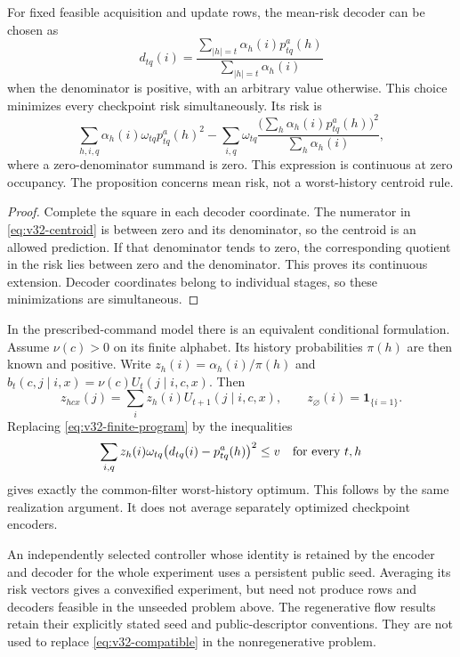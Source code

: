 \begin{proposition}\label{prop:v32-centroids}
For fixed feasible acquisition and update rows, the mean-risk decoder can
be chosen as
\begin{equation}\label{eq:v32-centroid}
 d_{tq}(i)=
 \frac{\sum_{|h|=t}\alpha_h(i)p^a_{tq}(h)}
      {\sum_{|h|=t}\alpha_h(i)}
\end{equation}
when the denominator is positive, with an arbitrary value otherwise.
This choice minimizes every checkpoint risk simultaneously. Its risk is
\[
 \sum_{h,i,q}\alpha_h(i)\omega_{tq}p^a_{tq}(h)^2
 -\sum_{i,q}\omega_{tq}
  \frac{\bigl(\sum_h\alpha_h(i)p^a_{tq}(h)\bigr)^2}
       {\sum_h\alpha_h(i)},
\]
where a zero-denominator summand is zero. This expression is continuous
at zero occupancy. The proposition concerns mean risk, not a
worst-history centroid rule.
\end{proposition}
\begin{proof}
Complete the square in each decoder coordinate. The numerator in
\eqref{eq:v32-centroid} is between zero and its denominator, so the
centroid is an allowed prediction. If that denominator tends to zero,
the corresponding quotient in the risk lies between zero and the
denominator. This proves its continuous extension. Decoder coordinates
belong to individual stages, so these minimizations are simultaneous.
\end{proof}

In the prescribed-command model there is an equivalent conditional
formulation. Assume $\nu(c)>0$ on its finite alphabet. Its history probabilities $\pi(h)$ are then known and positive.
Write $z_h(i)=\alpha_h(i)/\pi(h)$ and
$b_t(c,j\mid i,x)=\nu(c)U_t(j\mid i,c,x)$. Then
\begin{equation}\label{eq:v32-conditional}
 z_{hcx}(j)=\sum_i z_h(i)U_{t+1}(j\mid i,c,x),\qquad
 z_{\varnothing}(i)=\mathbf1_{\{i=1\}}.
\end{equation}
Replacing \eqref{eq:v32-finite-program} by the inequalities
\begin{equation}\label{eq:v32-worst-program}
 \sum_{i,q}z_h(i)\omega_{tq}
    \bigl(d_{tq}(i)-p^a_{tq}(h)\bigr)^2\le v
       \quad\hbox{for every }t,h
\end{equation}
gives exactly the common-filter worst-history optimum. This follows by
the same realization argument. It does not average separately optimized
checkpoint encoders.

\begin{remark}
An independently selected controller whose identity is retained by the
encoder and decoder for the whole experiment uses a persistent public
seed. Averaging its risk vectors gives a convexified experiment, but need
not produce rows and decoders feasible in the unseeded problem above.
The regenerative flow results retain their explicitly stated seed and
public-descriptor conventions. They are not used to replace
\eqref{eq:v32-compatible} in the nonregenerative problem.
\end{remark}

